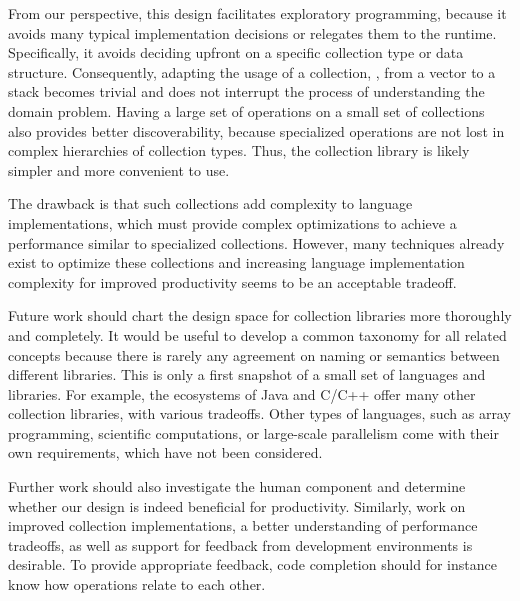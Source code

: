 \documentclass[sigconf, 10pt]{acmart}
\begin{document}
From our perspective, this design facilitates exploratory programming,
because it avoids many typical implementation decisions or relegates them to the runtime.
Specifically, it avoids deciding upfront on a specific collection type
or data structure.
Consequently, adapting the usage of a collection,
\eg, from a vector to a stack becomes trivial
and does not interrupt the process of understanding the domain problem.
Having a large set of operations on a small set of collections also
provides better discoverability,
because specialized operations
are not lost in complex hierarchies of collection types.
Thus, the collection library is likely simpler and more convenient to use.

The drawback is that such collections
add complexity to language implementations,
which must provide complex optimizations
to achieve a performance similar to specialized collections.
However, many techniques already exist to optimize these collections
and increasing language implementation complexity for improved productivity
seems to be an acceptable tradeoff.

%


Future work should chart the design space for collection libraries more 
thoroughly and completely.
It would be useful to develop a common taxonomy for all related concepts
because there is rarely any agreement on naming or semantics between different
libraries.
This is only a first snapshot of a small set of languages and libraries.
For example, the ecosystems of Java and  C/C++
offer many other collection libraries,
with various tradeoffs.
Other types of languages, such as array programming,
scientific computations, or large-scale parallelism come with their own
requirements, which have not been considered.

Further work should also investigate the human component and determine whether
our design is indeed beneficial for productivity.
Similarly, work on improved collection implementations,
a better understanding of performance tradeoffs,
as well as support for feedback from development environments is desirable. 
To provide appropriate feedback,
code completion should for instance know how operations relate to each other.
\end{document}
